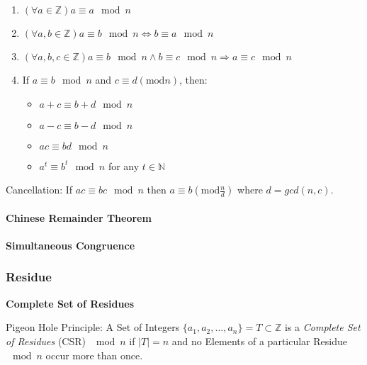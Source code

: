 \begin{enumerate}

  \item $(\forall a \in \mathbb{Z}) a \equiv a \mod n$

  \item $(\forall a,b \in \mathbb{Z}) a \equiv b \mod n
    \Leftrightarrow b \equiv a \mod n$

  \item $(\forall a,b,c \in \mathbb{Z}) a \equiv b \mod n
    \wedge b \equiv c \mod n \Rightarrow a \equiv c
    \mod n$

  \item
    If $a \equiv b \mod n$ and $c \equiv d (\mathrm{mod }
    n)$, then:
    \begin{itemize}
    \item $a + c \equiv b + d \mod n$
    \item $a - c \equiv b - d \mod n$
    \item $ac \equiv bd \mod n$
    \item $a^t \equiv b ^t \mod n$ for any $t \in
      \mathbb{N}$
    \end{itemize}

\end{enumerate}

Cancellation: If $ac \equiv bc \mod n$ then $a \equiv b
(\mathrm{mod } \frac{n}{d})$ where $d = gcd(n,c)$.



\paragraph{Chinese Remainder Theorem}\label{sec:chinese_remainder}\hfill

\paragraph{Simultaneous Congruence}\label{sec:simultaneous_congruence}\hfill



\subsubsection{Residue}\label{sec:residue}

\textbf{Complete Set of Residues}

Pigeon Hole Principle: A Set of Integers $\{a_1, a_2, \ldots, a_n\} =
T \subset \mathbb{Z}$ is a \emph{Complete Set of Residues} (CSR)
$\mod n$ if $|T| = n$ and no Elements of a particular Residue
$\mod n$ occur more than once.

